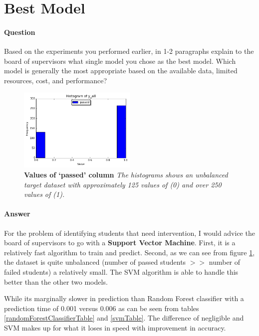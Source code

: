 \documentclass[12pt]{article}
\begin{document}

\section*{Best Model}
\paragraph{\textbf{Question}} Based on the experiments you performed earlier, in 1-2 paragraphs explain to the board of supervisors what single model you chose as the best model. Which model is generally the most appropriate based on the available data, limited resources, cost, and performance?

\begin{figure}[!htbp]
  \centering
    \includegraphics[width=0.5\textwidth]{images/y_all}
\caption{\textbf{Values of `passed' column} \textit{The histograms shows an unbalanced target dataset with approximately 125 values of (0) and over 250 values of (1).}}
\label{y_all}
\end{figure}


\paragraph{\textbf{Answer}} For the problem of identifying students that need intervention, I would advice the board of supervisors to go with a \textbf{Support Vector Machine}. First, it is a relatively fast algorithm to train and predict. 
Second, as we can see from figure \ref{y_all}, the dataset is quite unbalanced (number of passed students $>>$ number of failed students) a relatively small. The SVM algorithm is able to handle this better than the other two models. 

While its marginally slower in prediction than Random Forest classifier with a prediction time of 0.001 versus 0.006 as can be seen from tables \ref{randomForestClassifierTable} and \ref{svmTable}. The difference of negligible and SVM makes up for what it loses in speed with improvement in accuracy.
\end{document}
